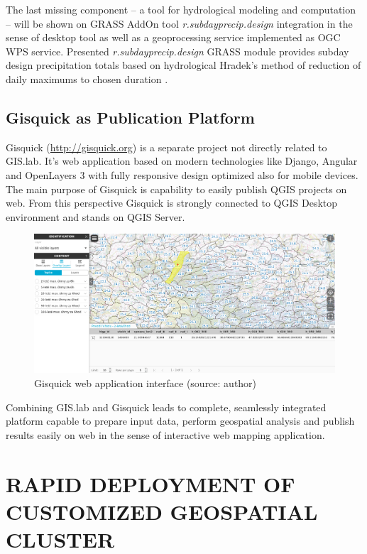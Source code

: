 \documentclass{isprs}
\begin{document}
The last missing component -- a tool for hydrological modeling and
computation -- will be shown on GRASS AddOn tool
\textit{r.subdayprecip.design} integration in the sense of desktop
tool as well as a geoprocessing service implemented as OGC WPS
service. Presented \textit{r.subdayprecip.design} GRASS module
provides subday design precipitation totals based on hydrological
Hradek's method of reduction of daily maximums to chosen duration
\cite{landa.2015:FOSS4GE2015}.

\subsection{Gisquick as Publication Platform}

Gisquick (\url{http://gisquick.org}) is a separate project not
directly related to GIS.lab. It's web application based on modern
technologies like Django, Angular and OpenLayers 3 with fully
responsive design optimized also for mobile devices. The main purpose
of Gisquick is capability to easily publish QGIS projects on web. From
this perspective Gisquick is strongly connected to QGIS Desktop
environment and stands on QGIS Server.

\begin{figure}[ht!]
\begin{center}
  \includegraphics[width=0.9\columnwidth]{figures/gisquick-identify.png}
  \caption{Gisquick web application interface
    (source: author)}
\label{fig:gislab_infrastructure}
\end{center}
\end{figure}

Combining GIS.lab and Gisquick leads to complete, seamlessly
integrated platform capable to prepare input data, perform geospatial
analysis and publish results easily on web in the sense of interactive
web mapping application.

\section{RAPID DEPLOYMENT OF CUSTOMIZED GEOSPATIAL CLUSTER}
\end{document}
